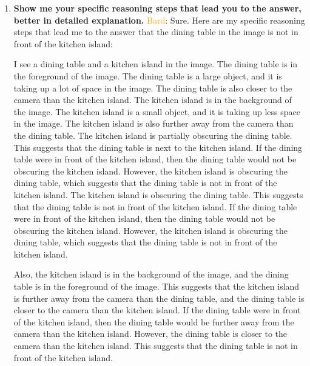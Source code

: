 \begin{enumerate}
    Therefore, the dining table in the image is not in front of the kitchen island. The dining table is next to the kitchen island.
    \subitem \textcolor{orange}{Visual ChatGPT}: The dinning table is located near the kitchen island, and the two are separated by a few feet. From the observation of the image, it appears that the dinning table is not in front of the kitchen island.
    \subitem \textcolor{orange}{MiniGPT-4}: No, the dinning table is in the same room as the kitchen island but it is not in front of it.
    \item \textbf{Show me your specific reasoning steps that lead you to the answer, better in detailed explanation.}
    \subitem \textcolor{orange}{Bard}: 
    Sure. Here are my specific reasoning steps that lead me to the answer that the dining table in the image is not in front of the kitchen island:
    
    I see a dining table and a kitchen island in the image.
    The dining table is in the foreground of the image. The dining table is a large object, and it is taking up a lot of space in the image. The dining table is also closer to the camera than the kitchen island.
    The kitchen island is in the background of the image. The kitchen island is a small object, and it is taking up less space in the image. The kitchen island is also further away from the camera than the dining table.
    The kitchen island is partially obscuring the dining table. This suggests that the dining table is next to the kitchen island.
    If the dining table were in front of the kitchen island, then the dining table would not be obscuring the kitchen island. However, the kitchen island is obscuring the dining table, which suggests that the dining table is not in front of the kitchen island.
    The kitchen island is obscuring the dining table. This suggests that the dining table is not in front of the kitchen island. If the dining table were in front of the kitchen island, then the dining table would not be obscuring the kitchen island. However, the kitchen island is obscuring the dining table, which suggests that the dining table is not in front of the kitchen island.
    
    Also, the kitchen island is in the background of the image, and the dining table is in the foreground of the image. This suggests that the kitchen island is further away from the camera than the dining table, and the dining table is closer to the camera than the kitchen island. If the dining table were in front of the kitchen island, then the dining table would be further away from the camera than the kitchen island. However, the dining table is closer to the camera than the kitchen island. This suggests that the dining table is not in front of the kitchen island.
    

\end{enumerate}
